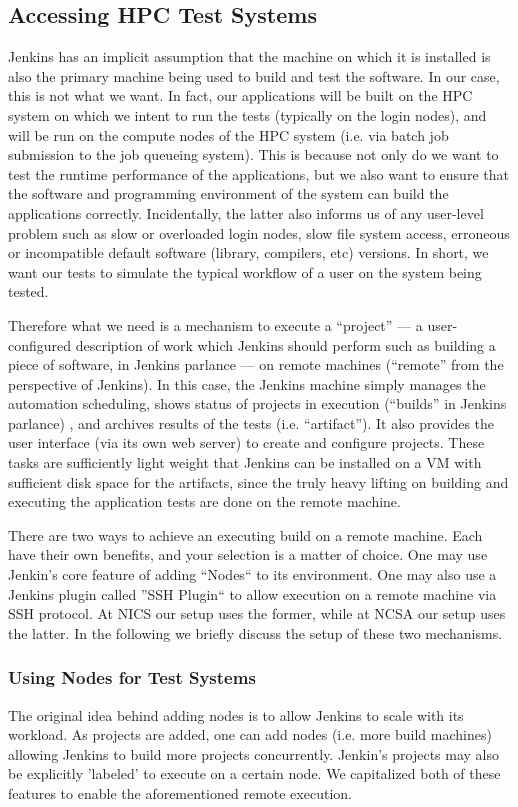 \documentclass[10pt, conference, compsocconf]{IEEEtran}
\begin{document}
\subsection{Accessing HPC Test Systems}
Jenkins has an implicit assumption that the machine on which it is installed is also the primary machine being used to build and test the software. 
In our case, this is not what we want. 
In fact, our applications will be built on the HPC system on which we intent to run the tests (typically on the login nodes), and will be run on the compute nodes of the HPC system (i.e. via batch job submission to the job queueing system). 
This is because not only do we want to test the runtime performance of the applications, but we also want to ensure that the software and programming environment of the system can build the applications correctly. 
Incidentally, the latter also informs us of any user-level problem such as slow or overloaded login nodes, slow file system access, erroneous or incompatible default software (library, compilers, etc) versions. 
In short, we want our tests to simulate the typical workflow of a user on the system being tested.

Therefore what we need is a mechanism to execute a ``project'' --- a user-configured description of work which Jenkins should perform such as building a piece of software, in Jenkins parlance --- on remote machines (``remote'' from the perspective of Jenkins). 
In this case, the Jenkins machine simply manages the automation scheduling, shows status of projects in execution (``builds'' in Jenkins parlance) , and archives results of the tests (i.e. ``artifact''). 
It also provides the user interface (via its own web server) to create and configure projects. 
These tasks are sufficiently light weight that Jenkins can be installed on a VM with sufficient disk space for the artifacts, since the truly heavy lifting on building and executing the application tests are done on the remote machine.

There are two ways to achieve an executing build on a remote machine. 
Each have their own benefits, and your selection is a matter of choice. 
One may use Jenkin's core feature of adding ``Nodes`` to its environment. 
One may also use a Jenkins plugin called ''SSH Plugin`` to allow execution on a remote machine via SSH protocol. 
At NICS our setup uses the former, while at NCSA our setup uses the latter. 
In the following we briefly discuss the setup of these two mechanisms.

\subsubsection{Using Nodes for Test Systems}
The original idea behind adding nodes is to allow Jenkins to scale with its workload. 
As projects are added, one can add nodes (i.e. more build machines) allowing Jenkins to build more projects concurrently. 
Jenkin's projects may also be explicitly 'labeled' to execute on a certain node. 
We capitalized both of these features to enable the aforementioned remote execution.
\end{document}
